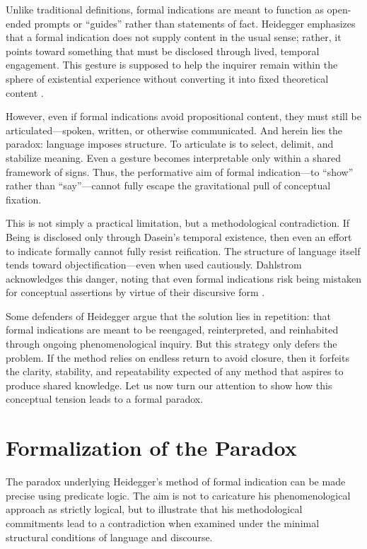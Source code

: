 \documentclass{article}
\begin{document}
Unlike traditional definitions, formal indications are meant to function as open-ended prompts or “guides” rather than statements of fact. Heidegger emphasizes that a formal indication does not supply content in the usual sense; rather, it points toward something that must be disclosed through lived, temporal engagement. This gesture is supposed to help the inquirer remain within the sphere of existential experience without converting it into fixed theoretical content \parencite[pp.~781–783]{dahlstrom1994}.

However, even if formal indications avoid propositional content, they must still be articulated—spoken, written, or otherwise communicated. And herein lies the paradox: language imposes structure. To articulate is to select, delimit, and stabilize meaning. Even a gesture becomes interpretable only within a shared framework of signs. Thus, the performative aim of formal indication—to “show” rather than “say”—cannot fully escape the gravitational pull of conceptual fixation.

This is not simply a practical limitation, but a methodological contradiction. If Being is disclosed only through Dasein’s temporal existence, then even an effort to indicate formally cannot fully resist reification. The structure of language itself tends toward objectification—even when used cautiously. Dahlstrom acknowledges this danger, noting that even formal indications risk being mistaken for conceptual assertions by virtue of their discursive form \parencite[p.~783]{dahlstrom1994}.

Some defenders of Heidegger argue that the solution lies in repetition: that formal indications are meant to be reengaged, reinterpreted, and reinhabited through ongoing phenomenological inquiry. But this strategy only defers the problem. If the method relies on endless return to avoid closure, then it forfeits the clarity, stability, and repeatability expected of any method that aspires to produce shared knowledge. Let us now turn our attention to show how this conceptual tension leads to a formal paradox.

\section*{Formalization of the Paradox}

The paradox underlying Heidegger’s method of formal indication can be made precise using predicate logic. The aim is not to caricature his phenomenological approach as strictly logical, but to illustrate that his methodological commitments lead to a contradiction when examined under the minimal structural conditions of language and discourse.
\end{document}
